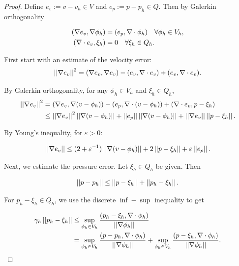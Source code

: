 \documentclass[12pt]{article}
\begin{document}
    \begin{proof}
        Define $e_v := v - v_h \in V$ and $e_p := p - p_h \in Q$. Then by Galerkin
        orthogonality

        \begin{equation}
            \begin{split}
                (\nabla e_v, \nabla \phi_h) &= (e_p, \nabla \cdot \phi_h) \quad \forall
                \phi_h \in V_h, \\
                (\nabla \cdot e_v, \xi_h) &= 0 \quad \forall \xi_h \in Q_h.
            \end{split}
        \end{equation}

        First start with an estimate of the velocity error:
        \[
            \left|\left|\nabla e_v\right|\right|^2 = (\nabla e_v, \nabla e_v) - (e_v, \nabla \cdot e_v) + (e_v,
            \nabla \cdot e_v).
            \]

            By Galerkin orthogonality, for any $\phi_h \in V_h$ and $\xi_h \in Q_h$,
            \begin{align*}
                \left|\left|\nabla e_v\right|\right|^2 &= (\nabla e_v, \nabla(v - \phi_h)) - (e_p, \nabla \cdot (v
                - \phi_h)) + (\nabla \cdot e_v, p - \xi_h) \\
                & \leq \left|\left|\nabla e_v\right|\right|^2 \left|\left|\nabla(v - \phi_h)\right|\right| + \left|\left|e_p\right|\right|
                \left|\left|\nabla(v - \phi_h)\right|\right| + \left|\left|\nabla e_v\right|\right| \left|\left|p - \xi_h\right|\right|.
            \end{align*}

            By Young's inequality, for $\varepsilon > 0$:

            \begin{equation}
                \left|\left|\nabla e_v\right|\right| \leq (2 + \varepsilon^{-1}) \left|\left|\nabla(v - \phi_h)\right|\right| + 2
                \left|\left|p - \xi_h\right|\right| + \varepsilon \left|\left|e_p\right|\right|.
            \end{equation}

            Next, we estimate the pressure error. Let $\xi_h \in Q_h$ be given.
            Then

            \begin{equation}
                \left|\left|p - p_h\right|\right| \leq \left|\left|p - \xi_h\right|\right| + \left|\left|p_h - \xi_h\right|\right|.
            \end{equation}

            For $p_h - \xi_h \in Q_h$, we use the discrete $\inf-\sup$ inequality to get

            \begin{equation}
                \begin{split}
                    \gamma_h \left|\left|p_h - \xi_h\right|\right| &\leq \sup_{\phi_h \in V_h} \frac{(p_h
                    - \xi_h, \nabla \cdot \phi_h)}{\left|\left|\nabla \phi_h\right|\right|} \\
                    &= \sup_{\phi_h \in V_h} \frac{(p - p_h, \nabla \cdot
                    \phi_h)}{\left|\left|\nabla \phi_h\right|\right|} + \sup_{\phi_h \in V_h} \frac{(p -
                    \xi_h, \nabla \cdot \phi_h)}{\left|\left|\nabla \phi_h\right|\right|}.
                \end{split}
            \end{equation}


\end{proof}
\end{document}
